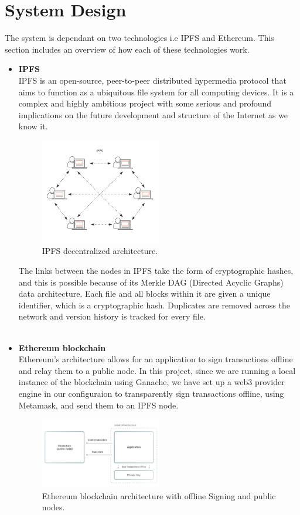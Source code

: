 \section{System Design}
The system is dependant on two technologies i.e IPFS and Ethereum. This section includes an overview of how each of these technologies work.
\begin{itemize}
\item\textbf{IPFS}\\
IPFS is an open-source, peer-to-peer distributed hypermedia protocol that aims to function as a ubiquitous file system for all computing devices. It is a complex and highly ambitious project with some serious and profound implications on the future development and structure of the Internet as we know it.\\
\begin{figure}[H]
  \caption{IPFS decentralized architecture.}
  \centering
  \includegraphics[width=0.5\textwidth]{images/IPFS.png}
\end{figure}
The links between the nodes in IPFS take the form of cryptographic hashes, and this is possible because of its Merkle DAG\cite{art20} (Directed Acyclic Graphs) data architecture. Each file and all blocks within it are given a unique identifier, which is a cryptographic hash. Duplicates are removed across the network and version history is tracked for every file.\\\\
\item\textbf{Ethereum blockchain}\\
Ethereum's architecture allows for an application to sign transactions offline and relay them to a public node. In this project, since we are running a local instance of the blockchain using Ganache, we have set up a web3 provider engine in our configuraion to transparently sign transactions offline, using Metamask, and send them to an IPFS node.
\begin{figure}[H]
  \caption{Ethereum blockchain architecture with offline Signing and public nodes.}
  \centering
  \includegraphics[scale=0.5, width=0.5\textwidth]{images/OfflineBlockchainarch.png}
\end{figure}
\end{itemize}

